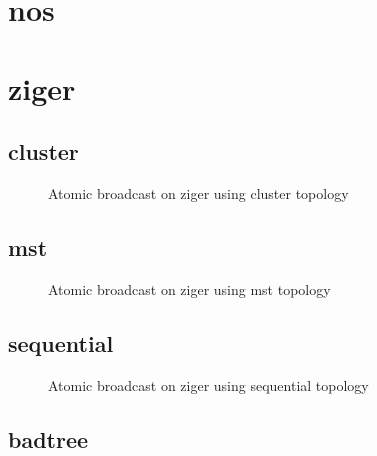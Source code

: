 \newpage\clearpage\section{nos}

\newpage\clearpage\section{ziger}

\subsection{cluster}

\begin{figure}[h!]
\begin{tikzpicture}[transform shape,scale=.25]

\end{tikzpicture}

\caption{Atomic broadcast on ziger using cluster topology}
\label{fig:ab_ziger_cluster}
\end{figure}
\clearpage\subsection{mst}

\begin{figure}[h!]
\begin{tikzpicture}[transform shape,scale=.25]

\end{tikzpicture}

\caption{Atomic broadcast on ziger using mst topology}
\label{fig:ab_ziger_mst}
\end{figure}
\clearpage\subsection{sequential}

\begin{figure}[h!]
\begin{tikzpicture}[transform shape,scale=.25]

\end{tikzpicture}

\caption{Atomic broadcast on ziger using sequential topology}
\label{fig:ab_ziger_sequential}
\end{figure}
\clearpage\subsection{badtree}

